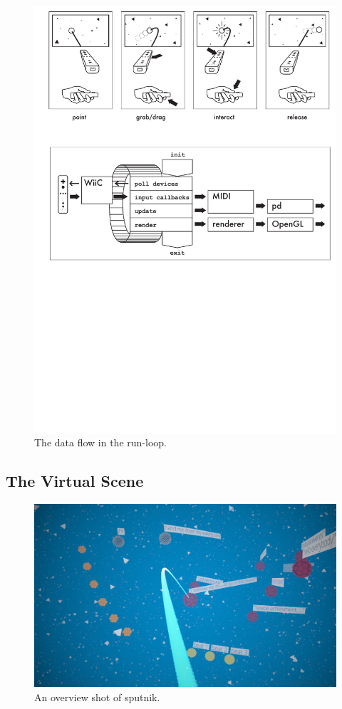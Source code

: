 \documentclass[10pt,a4paper]{scrartcl}
\begin{document}
\begin{figure}[hbtp]
\begin{center}
\includegraphics[width = 0.95 \columnwidth]{img/flow}
\caption{The data flow in the run-loop.}
\label{fig:flow}
\end{center}
\end{figure}



\subsection{The Virtual Scene}

\begin{figure}[hbtp]
\begin{center}
\includegraphics[width = 0.7 \columnwidth]{img/screen-shot-all}
\caption{An overview shot of sputnik.}
\label{fig:screen-shot-overview}
\end{center}
\end{figure}
\end{document}
